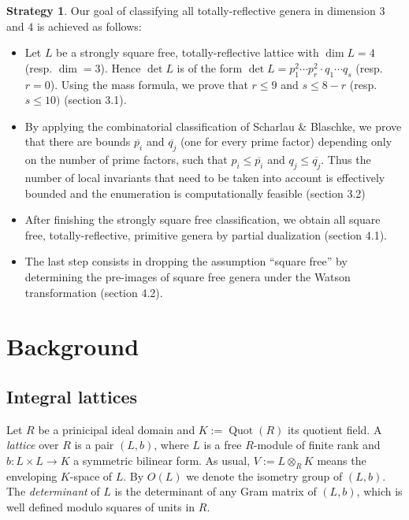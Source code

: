 \documentclass{amsart}
\theoremstyle{definition}
\newtheorem*{strat}{Strategy}
\theoremstyle{remark}
\DeclareMathOperator{\Quot}{Quot}
\begin{document}
\begin{strat} Our goal of classifying all totally-reflective genera in dimension $3$ and $4$ is achieved as follows:
 \begin{itemize}
  \item[Step 1:] Let $L$ be a strongly square free, totally-reflective lattice with $\dim L = 4$ (resp. $\dim = 3$). Hence $\det L$ is of the form $\det L = p_1^2 \cdots p_r^2 \cdot q_1 \cdots q_s$
                 (resp. $r=0$). 
                 Using the mass formula, we prove that $r \leq 9$ and $s \leq 8-r$ (resp. $s \leq 10)$ (section 3.1).
  \item[Step 2:] By applying the combinatorial classification of Scharlau \& Blaschke, we prove that there are bounds
                 $\overline{p_i}$ and $\overline{q_j}$ (one for every prime factor) depending only 
                 on the number of prime factors,
                 such that $p_i \leq \overline{p_i}$ and $q_j \leq \overline{q_j}$. Thus the number of local invariants that need to be taken into account
                 is effectively bounded and the enumeration is computationally feasible (section 3.2)
  \item[Step 3:] After finishing the strongly square free classification, we obtain all square free, totally-reflective, primitive genera by partial dualization (section 4.1).
  \item[Step 4:] The last step consists in dropping the assumption ``square free'' by determining the pre-images of square free genera under the Watson transformation (section 4.2).


 \end{itemize}
\end{strat}

\section{Background}
\subsection{Integral lattices}
Let $R$ be a prinicipal ideal domain and $K:=\Quot(R)$ its quotient field.
A \emph{lattice} over $R$ is a pair $(L,b)$, where $L$ is a free $R$-module of finite rank 
and $b:L \times L \longrightarrow K$ a symmetric bilinear form. As usual, $V:=L \otimes_R K$ means the enveloping $K$-space of $L$. By $O(L)$ we denote the isometry group of $(L,b)$.
The \emph{determinant} of $L$ is the determinant of any Gram matrix of $(L,b)$, which is well defined modulo squares of units in $R$.
\end{document}
